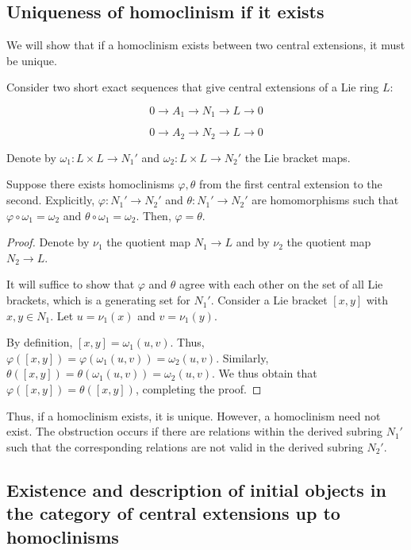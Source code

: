 \documentclass{ucetd}
\begin{document}
\subsection{Uniqueness of homoclinism if it exists}

We will show that if a homoclinism exists between two central
extensions, it must be unique.

\begin{lemma}\label{lemma:uniqueness-of-homoclinism-lie}
  Consider two short exact sequences that give central extensions of a Lie ring $L$:

  $$0 \to A_1 \to N_1 \to L \to 0$$

  $$0 \to A_2 \to N_2 \to L \to 0$$

  Denote by $\omega_1:L \times L \to N_1'$ and $\omega_2:L \times L
  \to N_2'$ the Lie bracket maps.

  Suppose there exists homoclinisms $\varphi,\theta$ from the first
  central extension to the second. Explicitly, $\varphi:N_1' \to N_2'$
  and $\theta:N_1' \to N_2'$ are homomorphisms such that $\varphi
  \circ \omega_1 = \omega_2$ and $\theta \circ \omega_1 =
  \omega_2$. Then, $\varphi = \theta$.
\end{lemma}

\begin{proof}
  Denote by $\nu_1$ the quotient map $N_1 \to L$ and by $\nu_2$ the
  quotient map $N_2 \to L$.

  It will suffice to show that $\varphi$ and $\theta$ agree with each
  other on the set of all Lie brackets, which is a generating set for
  $N_1'$. Consider a Lie bracket $[x,y]$ with $x,y \in N_1$. Let $u =
  \nu_1(x)$ and $v = \nu_1(y)$. 

  By definition, $[x,y] = \omega_1(u,v)$. Thus, $\varphi([x,y]) =
  \varphi(\omega_1(u,v)) = \omega_2(u,v)$. Similarly, $\theta([x,y]) =
  \theta(\omega_1(u,v)) = \omega_2(u,v)$. We thus obtain that
  $\varphi([x,y]) = \theta([x,y])$, completing the proof.
\end{proof}

Thus, if a homoclinism exists, it is unique. However, a homoclinism
need not exist. The obstruction occurs if there are relations within
the derived subring $N_1'$ such that the corresponding relations are
not valid in the derived subring $N_2'$.

\subsection{Existence and description of initial objects in the category of central extensions up to homoclinisms}
\end{document}
